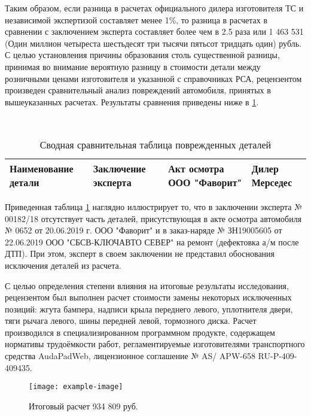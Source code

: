 Таким образом, если  разница в расчетах официального дилера изготовителя ТС и независимой экспертизой составляет менее 1\%, то разница в расчетах в сравнении с заключением эксперта составляет  более чем в 2.5 раза или 1 463 531 (Один миллион четыреста шестьдесят три тысячи пятьсот тридцать один) рубль. С целью установления причины образования столь существенной разницы, принимая во внимание вероятную разницу в стоимости детали  между розничными ценами изготовителя и указанной с справочниках РСА, рецензентом произведен сравнительный анализ повреждений автомобиля, принятых в вышеуказанных расчетах.   Результаты сравнения приведены ниже в \ref*{tab:sravnenie}.


{\footnotesize \
\begin{longtable}{|p{25mm}|p{50mm}|p{50mm}|p{50mm}}
\caption{\footnotesize {Сводная сравнительная таблица поврежденных деталей}}
\label{tab:sravnenie}\\ \hline
\textbf{Наименование детали} & \textbf{Заключение эксперта} & \textbf{Акт осмотра ООО "Фаворит"} & \textbf{Дилер Мерседес} \\ \hline \endhead


\end{longtable}}


Приведенная таблица \ref*{tab:sravnenie}  наглядно иллюстрирует то, что в заключении эксперта № 00182/18 отсутствует часть деталей, присутствующая в акте осмотра  автомобиля  \, № 0652 от 20.06.2019 г. ООО "Фаворит" и в заказ-наряде № ЗН19005605 от 22.06.2019 ООО "СБСВ-КЛЮЧАВТО СЕВЕР" на ремонт (дефектовка а/м после ДТП). При этом, эксперт  в своем заключении не представил обоснования исключения деталей из расчета.
\par С целью определения степени влияния на итоговые результаты исследования,  рецензентом был выполнен расчет стоимости замены некоторых  исключенных позиций: жгута бампера, надписи крыла переднего левого, уплотнителя двери, тяги рычага левого, шины передней левой, тормозного диска. Расчет производился   в специализированном программном продукте, содержащем нормативы трудоёмкости работ, регламентируемые изготовителями транспортного средства     AudaPadWeb, лицензионное соглашение № AS/\- APW-658  RU-P-409-409435. \\[3mm]
%
% 
\begin{figure}[H]
	\centering
	\texttt{[image: example-image]}
	\caption[]{Итоговый расчет 934 809 руб.}
	\label{fig:itog}
\end{figure}

